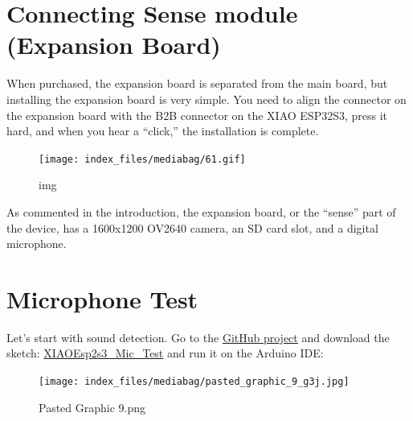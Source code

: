 \documentclass[
  letterpaper,
  DIV=11,
  numbers=noendperiod]{scrreprt}
\begin{document}
\hypertarget{connecting-sense-module-expansion-board}{%
\section*{Connecting Sense module (Expansion
Board)}\label{connecting-sense-module-expansion-board}}


When purchased, the expansion board is separated from the main board,
but installing the expansion board is very simple. You need to align the
connector on the expansion board with the B2B connector on the XIAO
ESP32S3, press it hard, and when you hear a ``click,'' the installation
is complete.

\begin{figure}[H]

{\centering \texttt{[image: index\_files/mediabag/61.gif]}

}

\caption{img}

\end{figure}

As commented in the introduction, the expansion board, or the ``sense''
part of the device, has a 1600x1200 OV2640 camera, an SD card slot, and
a digital microphone.

\hypertarget{microphone-test}{%
\section*{Microphone Test}\label{microphone-test}}


Let's start with sound detection. Go to the
\href{https://github.com/Mjrovai/XIAO-ESP32S3-Sense}{GitHub project} and
download the sketch:
\href{https://github.com/Mjrovai/XIAO-ESP32S3-Sense/tree/main/Mic_Test/XiaoEsp32s3_Mic_Test}{XIAOEsp2s3\_Mic\_Test}
and run it on the Arduino IDE:

\begin{figure}[H]

{\centering \texttt{[image: index\_files/mediabag/pasted\_graphic\_9\_g3j.jpg]}

}

\caption{Pasted Graphic 9.png}

\end{figure}
\end{document}
